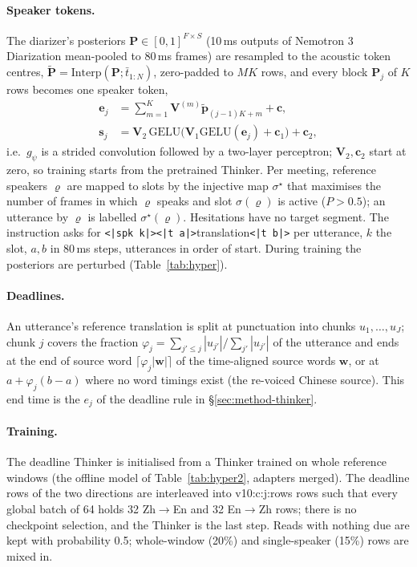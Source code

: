 \paragraph{Speaker tokens.} The diarizer's posteriors $\bm{P}\in[0,1]^{F\times S}$ (10\,ms outputs of Nemotron 3
Diarization mean-pooled to 80\,ms frames) are resampled to the acoustic token centres,
$\tilde{\bm{P}}=\mathrm{Interp}(\bm{P};\bar{t}_{1:N})$, zero-padded to $MK$ rows, and every block $\bm{P}_j$ of $K$ rows
becomes one speaker token,
\begin{equation}
\begin{aligned}
\bm{e}_j&=\textstyle\sum_{m=1}^{K}\bm{V}^{(m)}\tilde{\bm{p}}_{(j-1)K+m}+\bm{c},\\
\bm{s}_j&=\bm{V}_2\,\mathrm{GELU}\big(\bm{V}_1\mathrm{GELU}(\bm{e}_j)+\bm{c}_1\big)+\bm{c}_2,
\end{aligned}
\label{eq:conv}
\end{equation}
i.e.\ $g_\psi$ is a strided convolution followed by a two-layer perceptron; $\bm{V}_2,\bm{c}_2$ start at zero, so training starts from
the pretrained Thinker. Per meeting, reference speakers $\varrho$ are mapped to slots by the injective map $\sigma^\star$
that maximises the number of frames in which $\varrho$ speaks and slot $\sigma(\varrho)$ is active ($P>0.5$); an
utterance by $\varrho$ is labelled $\sigma^\star(\varrho)$. Hesitations have no target segment. The instruction asks for
\texttt{<|spk k|><|t a|>}translation\texttt{<|t b|>} per utterance, $k$ the slot, $a,b$ in 80\,ms steps, utterances in
order of start. During training the posteriors are perturbed (Table~\ref{tab:hyper}).

\paragraph{Deadlines.} An utterance's reference translation is split at punctuation into chunks $u_1,\dots,u_J$; chunk
$j$ covers the fraction $\varphi_j=\sum_{j'\le j}|u_{j'}|/\sum_{j'}|u_{j'}|$ of the utterance and ends at the end of
source word $\lceil\varphi_j|\bm{w}|\rceil$ of the time-aligned source words $\bm{w}$, or at $a+\varphi_j(b-a)$ where no
word timings exist (the re-voiced Chinese source). This end time is the $e_j$ of the deadline rule in \S\ref{sec:method-thinker}.

\paragraph{Training.} The deadline Thinker is initialised from a Thinker trained on whole reference windows (the
offline model of Table~\ref{tab:hyper2}, adapters merged). The deadline rows of the two directions are interleaved into
\num{v10:c:j:rows} rows such that every global batch of 64 holds 32 Zh$\rightarrow$En and 32 En$\rightarrow$Zh rows;
there is no checkpoint selection, and the Thinker is the last step. Reads with nothing due are kept with probability
0.5; whole-window (20\%) and single-speaker (15\%) rows are mixed in.

